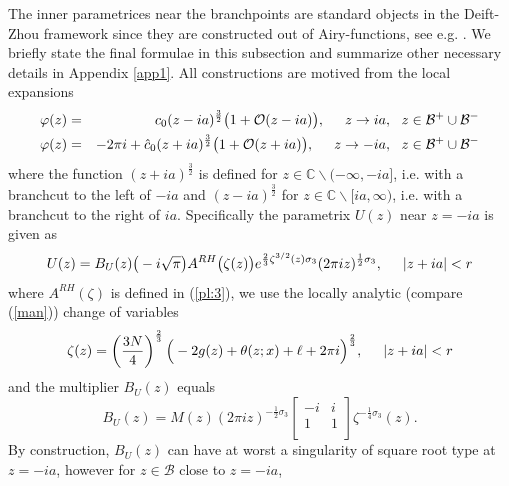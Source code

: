 \documentclass[10pt,oneside,reqno]{amsart}
\numberwithin{equation}{section}
\def\eqref#1{(\ref{#1})}
\begin{document}
The inner parametrices near the branchpoints are standard objects in the Deift-Zhou framework since they are constructed out of Airy-functions, see e.g. \cite{DKMVZ}.
We briefly state the final formulae in this subsection and summarize other necessary details in Appendix \ref{app1}. All constructions are motived from the local expansions 
\begin{eqnarray}
  \varphi(z) &=& c_0(z-ia)^{\frac{3}{2}}\big(1+\mathcal O(z-ia)\big),\hspace{0.5cm}z\rightarrow ia,\ \ z\in\mathcal{B}^+\cup\mathcal{B}^-\label{an}\\
  \varphi(z) &=&-2\pi i+\hat{c}_0(z+ia)^{\frac{3}{2}}\big(1+\mathcal O(z+ia)\big),\hspace{0.5cm}z\rightarrow -ia,\ \ z\in\mathcal{B}^+\cup\mathcal{B}^-\label{man}
\end{eqnarray}
where the function $(z+ia)^{\frac{3}{2}}$ is defined for $z\in\mathbb{C}\backslash(-\infty,-ia]$, i.e. with a branchcut to the left of $-ia$ and
$(z-ia)^{\frac{3}{2}}$ for $z\in\mathbb{C}\backslash[ia,\infty)$, i.e. with a branchcut to the right of $ia$. Specifically the parametrix $U(z)$ near $z=-ia$ is given as
\begin{equation}\label{mapara}
  U(z) = B_U(z)\big(-i\sqrt{\pi}\big)A^{RH}\big(\zeta(z)\big)e^{\frac{2}{3}\zeta^{3/2}(z)\sigma_3}(2\pi iz)^{\frac{1}{2}\sigma_3},
  \hspace{0.5cm}|z+ia|<r
\end{equation}
where $A^{RH}(\zeta)$ is defined in \eqref{pl:3}, we use the locally analytic (compare \eqref{man}) change of variables
\begin{equation*}
  \zeta(z) = \left(\frac{3N}{4}\right)^{\frac{2}{3}}\Big(-2g(z)+\theta(z;x)+\ell+2\pi i\Big)^{\frac{2}{3}},\hspace{0.5cm}|z+ia|<r
\end{equation*}
and the multiplier $B_U(z)$ equals
\begin{equation*}
  B_U(z) = M(z)(2\pi iz)^{-\frac{1}{2}\sigma_3}\begin{bmatrix}
                                                          -i & i\\
1 & 1\\
                                                         \end{bmatrix}\zeta^{-\frac{1}{4}\sigma_3}(z).
\end{equation*}
By construction, $B_U(z)$ can have at worst a singularity of square root type at $z=-ia$, however for $z\in\mathcal{B}$ close to $z=-ia$,
\end{document}
